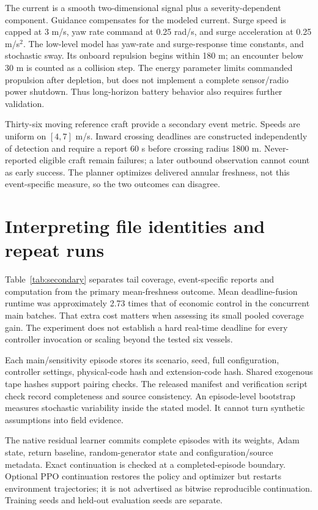 The current is a smooth two-dimensional signal plus a severity-dependent
component. Guidance compensates for the modeled current. Surge speed is capped
at 3 m/s, yaw rate command at 0.25 rad/s, and surge acceleration at
0.25 m/s$^2$. The low-level model has yaw-rate and surge-response time
constants, and stochastic sway. Its onboard repulsion begins within 180 m;
an encounter below 30 m is counted as a collision step. The energy parameter
limits commanded propulsion after depletion, but does not implement a complete
sensor/radio power shutdown. Thus long-horizon battery behavior also requires
further validation.

Thirty-six moving reference craft provide a secondary event metric. Speeds are
uniform on $[4,7]$ m/s. Inward crossing deadlines are constructed independently
of detection and require a report 60 s before crossing radius 1800 m.
Never-reported eligible craft remain failures; a later outbound observation
cannot count as early success. The planner optimizes delivered annular
freshness, not this event-specific measure, so the two outcomes can disagree.

\section{Interpreting file identities and repeat runs}

Table~\ref{tab:secondary} separates tail coverage, event-specific reports and
computation from the primary mean-freshness outcome. Mean deadline-fusion
runtime was approximately 2.73 times that of economic control in the concurrent
main batches. That extra cost matters when assessing its small pooled coverage
gain. The experiment does not establish a hard real-time deadline for every
controller invocation or scaling beyond the tested six vessels.

Each main/sensitivity episode stores its scenario, seed, full configuration,
controller settings, physical-code hash and extension-code hash. Shared
exogenous tape hashes support pairing checks. The released manifest and
verification script check record completeness and source consistency.
An episode-level bootstrap measures stochastic variability inside the stated
model. It cannot turn synthetic assumptions into field evidence.

The native residual learner commits complete episodes with its weights, Adam
state, return baseline, random-generator state and configuration/source
metadata. Exact continuation is checked at a completed-episode boundary.
Optional PPO continuation restores the policy and optimizer but restarts
environment trajectories; it is not advertised as bitwise reproducible
continuation. Training seeds and held-out evaluation seeds are separate.
